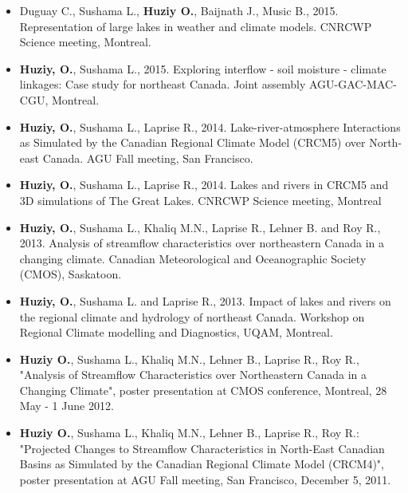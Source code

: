 
\vspace{\vertspace}

{
\renewcommand{\labelitemi}{}
\begin{itemize}


   \item Duguay C., Sushama L., \textbf{Huziy O.}, Baijnath J., Music B., 2015.
   Representation of large lakes in weather and climate models. CNRCWP Science
   meeting, Montreal.

   \item \textbf{Huziy, O.}, Sushama L., 2015. Exploring interflow - soil moisture - climate
   linkages: Case study for northeast Canada. Joint assembly AGU-GAC-MAC-CGU, Montreal.

   \item \textbf{Huziy, O.}, Sushama L., Laprise R., 2014. Lake-river-atmosphere Interactions
   as Simulated by the Canadian Regional Climate Model (CRCM5) over North-east
   Canada. AGU Fall meeting, San Francisco.

   \item \textbf{Huziy, O.}, Sushama L., Laprise R., 2014. Lakes and rivers in
   CRCM5 and 3D simulations of The Great Lakes. CNRCWP Science meeting, Montreal

   \item \textbf{Huziy, O.}, Sushama L., Khaliq M.N., Laprise R., Lehner B. and Roy
    R., 2013. Analysis of streamflow characteristics over northeastern Canada in a
    changing climate. Canadian Meteorological and Oceanographic Society (CMOS),
    Saskatoon.

   \item \textbf{Huziy, O.}, Sushama L. and Laprise R., 2013. Impact of lakes
   and rivers on the regional climate and hydrology of northeast Canada.
   Workshop on Regional Climate modelling and Diagnostics, UQAM, Montreal.

    \item \textbf{Huziy O.}, Sushama L., Khaliq M.N., Lehner B., Laprise R., Roy
    R., "Analysis of Streamflow Characteristics over Northeastern Canada in a
    Changing Climate", poster presentation at CMOS conference, Montreal, 28 May -
    1 June 2012.

    \item \textbf{Huziy O.}, Sushama L., Khaliq M.N., Lehner B., Laprise R., Roy
    R.: "Projected Changes to Streamflow Characteristics in North-East Canadian
    Basins as Simulated by the Canadian Regional Climate Model (CRCM4)", poster
    presentation at AGU Fall meeting, San Francisco, December 5, 2011.


\end{itemize}}
